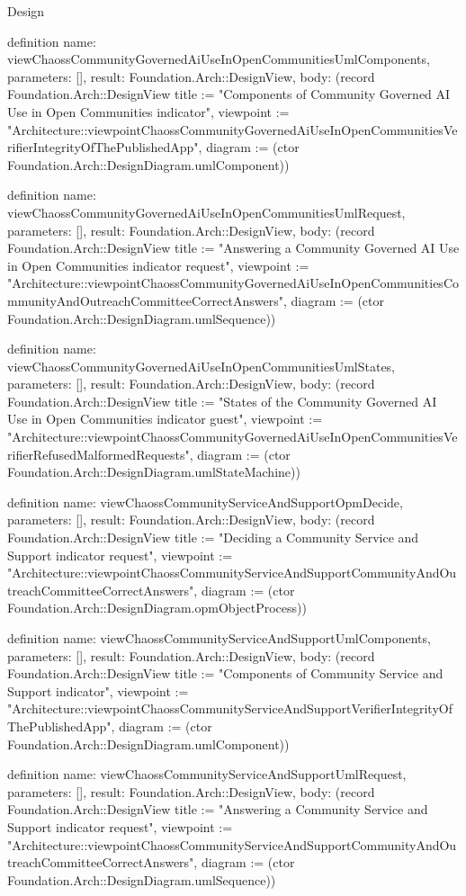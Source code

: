 \begin{lexlean}{Design}
\begin{semanticmodule}
definition{
  name: viewChaossCommunityGovernedAiUseInOpenCommunitiesUmlComponents,
  parameters: [],
  result: Foundation.Arch::DesignView,
  body: (record Foundation.Arch::DesignView {title := "Components of Community Governed AI Use in Open Communities indicator", viewpoint := "Architecture::viewpointChaossCommunityGovernedAiUseInOpenCommunitiesVerifierIntegrityOfThePublishedApp", diagram := (ctor Foundation.Arch::DesignDiagram.umlComponent)})
}

definition{
  name: viewChaossCommunityGovernedAiUseInOpenCommunitiesUmlRequest,
  parameters: [],
  result: Foundation.Arch::DesignView,
  body: (record Foundation.Arch::DesignView {title := "Answering a Community Governed AI Use in Open Communities indicator request", viewpoint := "Architecture::viewpointChaossCommunityGovernedAiUseInOpenCommunitiesCommunityAndOutreachCommitteeCorrectAnswers", diagram := (ctor Foundation.Arch::DesignDiagram.umlSequence)})
}

definition{
  name: viewChaossCommunityGovernedAiUseInOpenCommunitiesUmlStates,
  parameters: [],
  result: Foundation.Arch::DesignView,
  body: (record Foundation.Arch::DesignView {title := "States of the Community Governed AI Use in Open Communities indicator guest", viewpoint := "Architecture::viewpointChaossCommunityGovernedAiUseInOpenCommunitiesVerifierRefusedMalformedRequests", diagram := (ctor Foundation.Arch::DesignDiagram.umlStateMachine)})
}

definition{
  name: viewChaossCommunityServiceAndSupportOpmDecide,
  parameters: [],
  result: Foundation.Arch::DesignView,
  body: (record Foundation.Arch::DesignView {title := "Deciding a Community Service and Support indicator request", viewpoint := "Architecture::viewpointChaossCommunityServiceAndSupportCommunityAndOutreachCommitteeCorrectAnswers", diagram := (ctor Foundation.Arch::DesignDiagram.opmObjectProcess)})
}

definition{
  name: viewChaossCommunityServiceAndSupportUmlComponents,
  parameters: [],
  result: Foundation.Arch::DesignView,
  body: (record Foundation.Arch::DesignView {title := "Components of Community Service and Support indicator", viewpoint := "Architecture::viewpointChaossCommunityServiceAndSupportVerifierIntegrityOfThePublishedApp", diagram := (ctor Foundation.Arch::DesignDiagram.umlComponent)})
}

definition{
  name: viewChaossCommunityServiceAndSupportUmlRequest,
  parameters: [],
  result: Foundation.Arch::DesignView,
  body: (record Foundation.Arch::DesignView {title := "Answering a Community Service and Support indicator request", viewpoint := "Architecture::viewpointChaossCommunityServiceAndSupportCommunityAndOutreachCommitteeCorrectAnswers", diagram := (ctor Foundation.Arch::DesignDiagram.umlSequence)})
}


\end{semanticmodule}
\end{lexlean}
